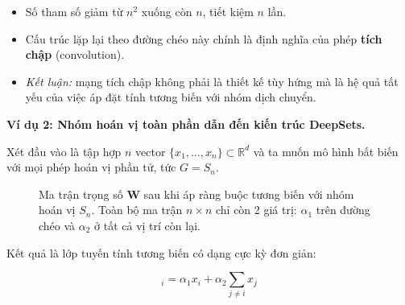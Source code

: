 \begin{itemize}
    \item Số tham số giảm từ $n^2$ xuống còn $n$, tiết kiệm $n$ lần.
    \item Cấu trúc lặp lại theo đường chéo này chính là định nghĩa của phép \textbf{tích chập} (convolution).
    \item \textit{Kết luận:} mạng tích chập không phải là thiết kế tùy hứng mà là hệ quả tất yếu của việc áp đặt tính tương biến với nhóm dịch chuyển.
\end{itemize}

\vspace{0.5em}
\textbf{Ví dụ 2: Nhóm hoán vị toàn phần dẫn đến kiến trúc DeepSets.}

Xét đầu vào là tập hợp $n$ vector $\{x_1, \ldots, x_n\} \subset \mathbb{R}^d$ và ta muốn mô hình bất biến với mọi phép hoán vị phần tử, tức $G = S_n$.

\begin{figure}[H]
\centering
{}
\caption{Ma trận trọng số $\mathbf{W}$ sau khi áp ràng buộc tương biến với nhóm hoán vị $S_n$. Toàn bộ ma trận $n \times n$ chỉ còn 2 giá trị: $\alpha_1$ trên đường chéo và $\alpha_2$ ở tất cả vị trí còn lại.}
\label{fig:permutation-matrix}
\end{figure}

Kết quả là lớp tuyến tính tương biến có dạng cực kỳ đơn giản:

\begin{equation}
    [\mathbf{F}(\mathbf{X})]_i = \alpha_1 x_i + \alpha_2 \sum_{j \neq i} x_j
    \label{eq:deepset-layer}
\end{equation}


